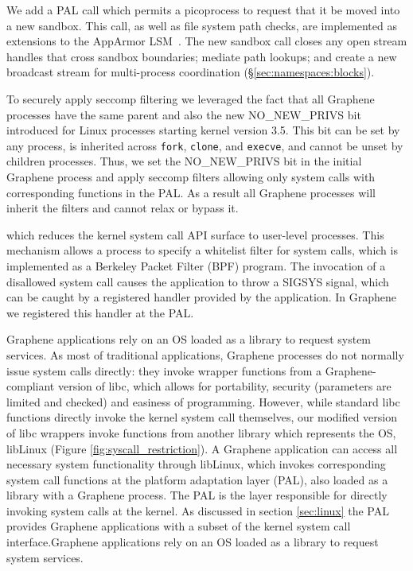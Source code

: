 \vspace{5pt}
 We add a PAL call which
permits a picoprocess to request that it be moved into a new sandbox.
This call, as well as file system path checks, are implemented
as extensions to the  AppArmor LSM~\cite{apparmor}.
The new sandbox call closes any open stream handles that cross sandbox boundaries;
mediate path lookups;
and create a new broadcast stream for multi-process
 coordination (\S\ref{sec:namespaces:blocks}).

To securely apply seccomp filtering we leveraged the fact that all
Graphene processes have the same parent and also the new
NO\_NEW\_PRIVS bit introduced for Linux processes starting kernel
version 3.5. This bit can be set by any process, is inherited across
{\tt fork}, {\tt clone}, and {\tt execve}, and cannot be unset by
children processes. Thus, we set the NO\_NEW\_PRIVS bit in the initial
Graphene process and apply seccomp filters allowing only system calls
with corresponding functions in the PAL. As a result all Graphene
processes will inherit the filters and cannot relax or bypass it.



which reduces the kernel
system call API surface to user-level processes. This mechanism allows
a process to specify a whitelist filter for system calls, which is
implemented as a Berkeley Packet Filter (BPF) program. The invocation
of a disallowed system call causes the application to throw a SIGSYS
signal, which can be caught by a registered handler provided by the
application. In Graphene we registered this handler at the PAL.


Graphene applications rely on an OS loaded as a library to request
system services. As most of traditional applications, Graphene
processes do not normally issue system calls directly: they invoke
wrapper functions from a Graphene-compliant version of libc, which
allows for portability, security (parameters are limited and checked)
and easiness of programming. However, while standard libc functions
directly invoke the kernel system call themselves, our modified
version of libc wrappers invoke functions from another library which
represents the OS, libLinux (Figure \ref{fig:syscall_restriction}). A
Graphene application can access all necessary system functionality
through libLinux, which invokes corresponding system call functions at
the platform adaptation layer (PAL), also loaded as a library with a
Graphene process. The PAL is the layer responsible for directly
invoking system calls at the kernel. As discussed in section
\ref{sec:linux} the PAL provides Graphene applications with a
subset of the kernel system call interface.Graphene applications rely
on an OS loaded as a library to request system services.

